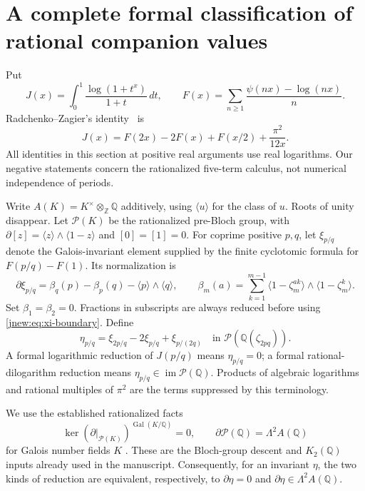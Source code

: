 \section{A complete formal classification of rational companion values}
\label{jnew:sec:classification}

Put
\[
 J(x)=\int_0^1\frac{\log(1+t^x)}{1+t}\,dt,
 \qquad
 F(x)=\sum_{n\ge1}\frac{\psi(nx)-\log(nx)}n.
\]
Radchenko--Zagier's identity~\cite{RadchenkoZagier} is
\begin{equation}\label{jnew:eq:JF}
 J(x)=F(2x)-2F(x)+F(x/2)+\frac{\pi^2}{12x}.
\end{equation}
All identities in this section at positive real arguments use real logarithms.
Our negative statements concern the rationalized five-term calculus, not
numerical independence of periods.

Write $A(K)=K^\times\otimes_{\mathbb Z}\mathbb Q$ additively, using
$\langle u\rangle$ for the class of $u$. Roots of unity disappear.
Let $\mathcal P(K)$ be the rationalized pre-Bloch group, with
$\partial[z]=\langle z\rangle\wedge\langle1-z\rangle$ and
$[0]=[1]=0$. For coprime positive $p,q$, let $\xi_{p/q}$ denote the
Galois-invariant element supplied by the finite cyclotomic formula for
$F(p/q)-F(1)$. Its normalization is
\begin{equation}\label{jnew:eq:xi-boundary}
 \partial\xi_{p/q}
 =\beta_q(p)-\beta_p(q)-\langle p\rangle\wedge\langle q\rangle,
 \qquad
 \beta_m(a)=\sum_{k=1}^{m-1}
 \langle1-\zeta_m^{ak}\rangle\wedge\langle1-\zeta_m^k\rangle.
\end{equation}
Set $\beta_1=\beta_2=0$. Fractions in subscripts are always reduced
before using \eqref{jnew:eq:xi-boundary}. Define
\begin{equation}\label{jnew:eq:eta}
 \eta_{p/q}=\xi_{2p/q}-2\xi_{p/q}+\xi_{p/(2q)}
 \quad\text{in }\mathcal P(\mathbb Q(\zeta_{2pq})).
\end{equation}
A formal logarithmic reduction of $J(p/q)$ means $\eta_{p/q}=0$;
a formal rational-dilogarithm reduction means
$\eta_{p/q}\in\operatorname{im}\mathcal P(\mathbb Q)$.
Products of algebraic logarithms and rational multiples of $\pi^2$
are the terms suppressed by this terminology.

We use the established rationalized facts
\[
 \ker(\partial|_{\mathcal P(K)})^{\operatorname{Gal}(K/\mathbb Q)}=0,
 \qquad
 \partial\mathcal P(\mathbb Q)=\Lambda^2 A(\mathbb Q)
\]
for Galois number fields $K$ \cite[\texttt{hstruct:eq:bloch-facts}]{ProveItSnapshot}. These are the Bloch-group descent and
$K_2(\mathbb Q)$ inputs already used in the manuscript. Consequently,
for an invariant $\eta$, the two kinds of reduction are equivalent,
respectively, to $\partial\eta=0$ and
$\partial\eta\in\Lambda^2 A(\mathbb Q)$.

